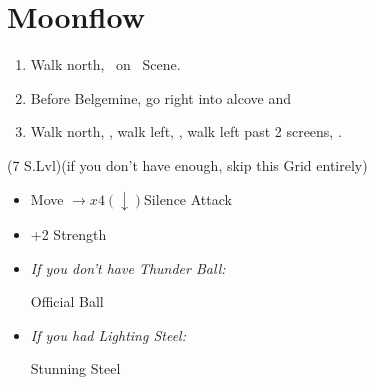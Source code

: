 \chapter{Moonflow}

\begin{enumerate}
	\item Walk north, \sd\ on \kimahri\ Scene.
	\item Before Belgemine, go right into alcove and 
	\item Walk north, \sd, walk left, \sd, walk left past 2 screens, \sd.
\end{enumerate}
\begin{spheregrid}
	\begin{itemize}
		\wakkaf (7 S.Lvl)(if you don't have enough, skip this Grid entirely)
		\begin{itemize}
			\item Move $\rightarrow x4 (\downarrow)$Silence Attack
			\item +2 Strength
		\end{itemize}
	\end{itemize}
\end{spheregrid}
\begin{equip}
    \begin{itemize}
    	\item \textit{If you don't have Thunder Ball:}
	\begin{itemize}
	\wakkaf Official Ball
	\end{itemize}
	\item \textit{If you had Lighting Steel:}
	\begin{itemize}
	\tidusf Stunning Steel
	\end{itemize}
    \end{itemize}
\end{equip}
